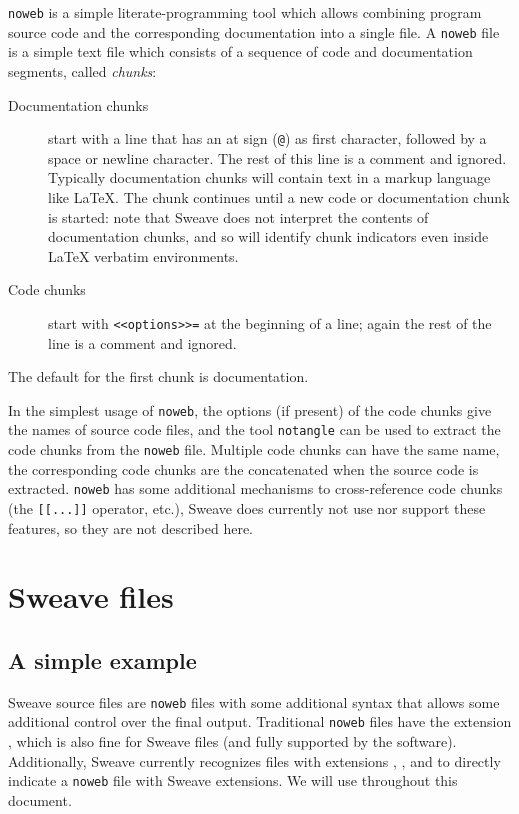 \documentclass[a4paper]{article}
\begin{document}
\texttt{noweb} \citep{flm:Ramsey:1998} is a simple
literate-programming tool which allows combining program source code
and the corresponding documentation into a single file.  A
\texttt{noweb} file is a simple text file which consists of a sequence
of code and documentation segments, called \emph{chunks}:
\begin{description}
\item[Documentation chunks] start with a line that has an at sign
  (\verb|@|) as first character, followed by a space or newline
  character. The rest of this line is a comment and ignored.
  Typically documentation chunks will contain text in a markup
  language like \LaTeX{}.  The chunk continues until a new code or
  documentation chunk is started: note that Sweave does not interpret
  the contents of documentation chunks, and so will identify chunk
  indicators even inside \LaTeX{} verbatim environments.

\item[Code chunks] start with \verb|<<options>>=| at the beginning of
  a line; again the rest of the line is a comment and ignored.
\end{description}
The default for the first chunk is documentation.

In the simplest usage of \texttt{noweb}, the options (if present) of
the code chunks give the names of source code files, and the tool
\texttt{notangle} can be used to extract the code chunks from the
\texttt{noweb} file. Multiple code chunks can have the same name, the
corresponding code chunks are the concatenated when the source code is
extracted. \texttt{noweb} has some additional mechanisms to
cross-reference code chunks (the \verb|[[...]]| operator, etc.),
Sweave does currently not use nor support these features, so they are
not described here.


\section{Sweave files}
\label{sec:sweavefile}

\subsection{A simple example}

Sweave source files are \texttt{noweb} files with some additional
syntax that allows some additional control over the final
output. Traditional \texttt{noweb} files have the extension
, which is also fine for Sweave files (and fully supported
by the software). Additionally, Sweave currently recognizes files with
extensions , ,  and
 to directly indicate a \texttt{noweb} file with Sweave
extensions. We will use  throughout this document.
\end{document}
